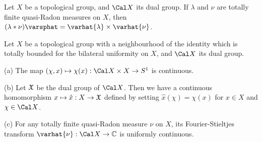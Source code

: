  Let $X$ be a topological group, and $\Cal X$ its
dual group.   If $\lambda$ and $\nu$ are totally finite quasi-Radon
measures on $X$, then 
$(\lambda*\nu)\varsphat=\varhat{\lambda}\times\varhat{\nu}$.



 Let $X$ be a topological group with a
neighbourhood of the identity which is totally bounded for the bilateral
uniformity on $X$, and $\Cal X$ its dual group.

(a) The map $(\chi,x)\mapsto \chi(x):\Cal X\times X\to S^1$ is
continuous.

(b) Let $\frak X$ be the dual group of $\Cal X$.   Then we have a continuous homomorphism
$x\mapsto\hat x:X\to\frak X$ defined by setting $\hat x(\chi)=\chi(x)$
for $x\in X$ and $\chi\in\Cal X$.

(c) For any totally finite quasi-Radon measure $\nu$ on $X$, its
Fourier-Stieltjes
transform $\varhat{\nu}:\Cal X\to\Bbb C$ is uniformly continuous.


